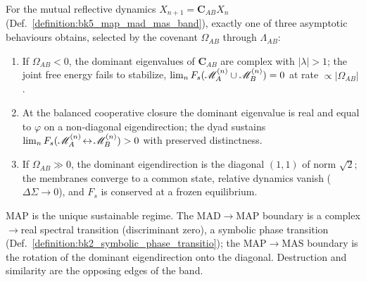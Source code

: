 \begin{theorem}
\label{theorem:bk5_map_mad_mas_trichotomy}
For the mutual reflective dynamics $X_{n+1}=\mathbf{C}_{AB}X_n$ (Def.~\ref{definition:bk5_map_mad_mas_band}), exactly one of three asymptotic behaviours obtains, selected by the covenant $\Omega_{AB}$ through $\Lambda_{AB}$:
\begin{enumerate}
  \item[\textbf{(MAD)}] If $\Omega_{AB}<0$, the dominant eigenvalues of $\mathbf{C}_{AB}$ are complex with $|\lambda|>1$; the joint free energy fails to stabilize, $\lim_n F_s(\mathscr{M}_A^{(n)}\cup\mathscr{M}_B^{(n)})=0$ at rate $\propto|\Omega_{AB}|$.
  \item[\textbf{(MAP)}] At the balanced cooperative closure the dominant eigenvalue is real and equal to $\varphi$ on a non-diagonal eigendirection; the dyad sustains $\lim_n F_s(\mathscr{M}_A^{(n)}\!\leftrightarrow\!\mathscr{M}_B^{(n)})>0$ with preserved distinctness.
  \item[\textbf{(MAS)}] If $\Omega_{AB}\gg0$, the dominant eigendirection is the diagonal $(1,1)$ of norm $\sqrt2$; the membranes converge to a common state, relative dynamics vanish ($\Delta\Sigma\to0$), and $F_s$ is conserved at a frozen equilibrium.
\end{enumerate}
$\mathrm{MAP}$ is the unique sustainable regime. The $\mathrm{MAD}\!\to\!\mathrm{MAP}$ boundary is a complex$\to$real spectral transition (discriminant zero), a symbolic phase transition (Def.~\ref{definition:bk2_symbolic_phase_transitio}); the $\mathrm{MAP}\!\to\!\mathrm{MAS}$ boundary is the rotation of the dominant eigendirection onto the diagonal. Destruction and similarity are the opposing edges of the band.
\end{theorem}
